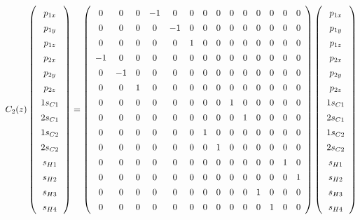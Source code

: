 \documentclass[9pt]{report}
\begin{document}
\normalsize


\scriptsize
\begin{equation}
C_{2}(z)
\renewcommand{\arraystretch}{1.4}
\left(\begin{array}{c} p_{1x}  \\  p_{1y}  \\  p_{1z}  \\  p_{2x}  \\ p_{2y} \\  p_{2z}  \\  1s_{C1}  \\  2s_{C1}  \\  1s_{C2}  \\  2s_{C2}  \\  s_{H1}  \\  s_{H2}  \\  s_{H3}  \\  s_{H4}   \\\end{array}\right)
=
\left(\begin{array}{cccccccccccccc}
0 & 0 & 0 & -1 & 0 & 0 & 0 & 0 & 0 & 0 & 0 & 0 & 0 & 0
\\
0 & 0 & 0 & 0 & -1 & 0 & 0 & 0 & 0 & 0 & 0 & 0 & 0 & 0
\\
0 & 0 & 0 & 0 & 0 & 1 & 0 & 0 & 0 & 0 & 0 & 0 & 0 & 0
\\
-1 & 0 & 0 & 0 & 0 & 0 & 0 & 0 & 0 & 0 & 0 & 0 & 0 & 0
\\
0 & -1 & 0 & 0 & 0 & 0 & 0 & 0 & 0 & 0 & 0 & 0 & 0 & 0
\\
0 & 0 & 1 & 0 & 0 & 0 & 0 & 0 & 0 & 0 & 0 & 0 & 0 & 0
\\
0 & 0 & 0 & 0 & 0 & 0 & 0 & 0 & 1 & 0 & 0 & 0 & 0 & 0
\\
0 & 0 & 0 & 0 & 0 & 0 & 0 & 0 & 0 & 1 & 0 & 0 & 0 & 0
\\
0 & 0 & 0 & 0 & 0 & 0 & 1 & 0 & 0 & 0 & 0 & 0 & 0 & 0
\\
0 & 0 & 0 & 0 & 0 & 0 & 0 & 1 & 0 & 0 & 0 & 0 & 0 & 0
\\
0 & 0 & 0 & 0 & 0 & 0 & 0 & 0 & 0 & 0 & 0 & 0 & 1 & 0
\\
0 & 0 & 0 & 0 & 0 & 0 & 0 & 0 & 0 & 0 & 0 & 0 & 0 & 1
\\
0 & 0 & 0 & 0 & 0 & 0 & 0 & 0 & 0 & 0 & 1 & 0 & 0 & 0
\\
0 & 0 & 0 & 0 & 0 & 0 & 0 & 0 & 0 & 0 & 0 & 1 & 0 & 0
\\\end{array}\right)
\left(\begin{array}{c} p_{1x}  \\  p_{1y}  \\  p_{1z}  \\  p_{2x}  \\ p_{2y} \\  p_{2z}  \\  1s_{C1}  \\  2s_{C1}  \\  1s_{C2}  \\  2s_{C2}  \\  s_{H1}  \\  s_{H2}  \\  s_{H3}  \\  s_{H4}   \\\end{array}\right)

\end{equation}
\end{document}
